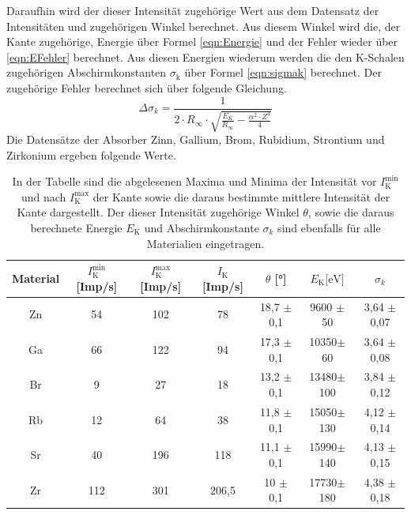 \documentclass[titlepage = firstcover]{scrartcl}
\begin{document}
            \noindent
            Daraufhin wird der dieser Intensität zugehörige Wert aus dem Datensatz der Intensitäten und zugehörigen Winkel berechnet. Aus diesem Winkel wird die, der Kante zugehörige, Energie über 
            Formel \ref{eqn:Energie} und der Fehler wieder über \ref{eqn:EFehler} berechnet. Aus diesen Energien wiederum werden die den K-Schalen zugehörigen Abschirmkonstanten $\sigma_{\text{k}}$ 
            über Formel \ref{eqn:sigmak} berechnet. Der zugehörige Fehler berechnet sich über folgende Gleichung.
            \begin{equation*}
              \Delta \sigma_k = \frac{1}{2 \cdot R_{\infty}\cdot \sqrt{\frac{E_K}{R_{\infty}} - \frac{\alpha^2 \cdot Z^4}{4}}}
            \end{equation*}
            \noindent
            Die Datensätze der Absorber Zinn, Gallium, Brom, Rubidium, Strontium und Zirkonium ergeben folgende Werte. 
            \FloatBarrier
            \begin{table}[h]
              \centering
              \caption{In der Tabelle sind die abgelesenen Maxima und Minima der Intensität vor $I_{\text{K}}^{\text{min}}$ und nach $I_{\text{K}}^{\text{max}}$ der Kante sowie die daraus bestimmte mittlere Intensität der Kante dargestellt. Der dieser Intensität zugehörige Winkel $\theta$, sowie die daraus berechnete Energie $E_{\text{K}}$ und Abschirmkonstante $\sigma_k$ sind ebenfalls für alle Materialien eingetragen.}
              \label{tab:Absorption}
            
              \begin{tabular}{c c c c c c c}
                \toprule
                {Material}  & {$I_{\text{K}}^{\text{min}}$ [Imp/s]} & {$I_{\text{K}}^{\text{max}}$ [Imp/s]} & {$I_{\text{K}}$ [Imp/s]} & {$\theta$ [°]} & {$E_{\text{K}} \text{[eV]}$} & {$\sigma_k$} \\ 
                \midrule
                Zn	                &  54              & 102           &    78       &    18,7 $\pm$ 0,1  &   9600 $\pm$ 50   &   3,64 $\pm$ 0,07   \\
                Ga	                &  66              &  122          &    94       &   17,3  $\pm$ 0,1  &   10350$\pm$ 60   &   3,64 $\pm$ 0,08    \\
                Br	                &  9               &  27           &    18       &   13,2  $\pm$ 0,1  &   13480$\pm$ 100  &   3,84 $\pm$ 0,12  \\
                Rb	                &  12              &  64           &    38       &   11,8  $\pm$ 0,1  &   15050$\pm$ 130  &   4,12 $\pm$ 0,14   \\
                Sr	                &  40              &  196          &    118      &    11,1 $\pm$ 0,1  &   15990$\pm$ 140  &   4,13 $\pm$ 0,15   \\
                Zr	                &  112             &  301          &    206,5    &    10   $\pm$ 0,1  &   17730$\pm$ 180  &   4,38 $\pm$ 0,18   \\
                \bottomrule
              \end{tabular}
            \end{table}
\end{document}
